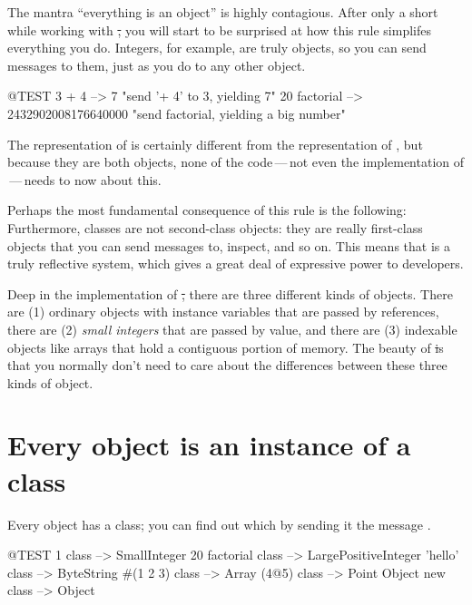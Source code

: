 \documentclass[a4paper,10pt,twoside]{book}
\begin{document}

The mantra ``everything is an object'' is highly contagious.
After only a short while working with \st, you will start to be surprised at how this rule simplifes everything you do.
Integers, for example, are truly objects, so you can send messages to them, just as you do to any other object.

\begin{code}{@TEST}
3 + 4            --> 7    "send '+ 4' to 3, yielding 7"
20 factorial  --> 2432902008176640000   "send factorial, yielding a big number"
\end{code}

The representation of  is certainly different from the representation of , but because they are both objects, none of the code\,---\,not even the implementation of \,---\,needs to now about this.

Perhaps the most fundamental consequence of this rule is the following:
Furthermore, classes are not second-class objects: they are really first-class objects that you can send messages to, inspect, and so on.
This means that \pharo is a truly reflective system, which gives a great deal of expressive power to developers.

Deep in the implementation of \st, there are three different kinds of objects.  There are (1) ordinary objects with instance variables that are passed by references, there are (2) \emph{small integers} that are passed by value, and there are (3) indexable objects like arrays that hold a contiguous portion of memory.  The beauty of \st is that you normally don't need to care about the differences between these three kinds of object.

\section{Every object is an instance of a class}


Every object has a class; you can find out which by sending it the message .

\begin{code}{@TEST}
1 class                 --> SmallInteger
20 factorial class --> LargePositiveInteger
'hello' class          --> ByteString
#(1 2 3) class       --> Array
(4@5) class         --> Point
Object new class --> Object
\end{code}
\end{document}

